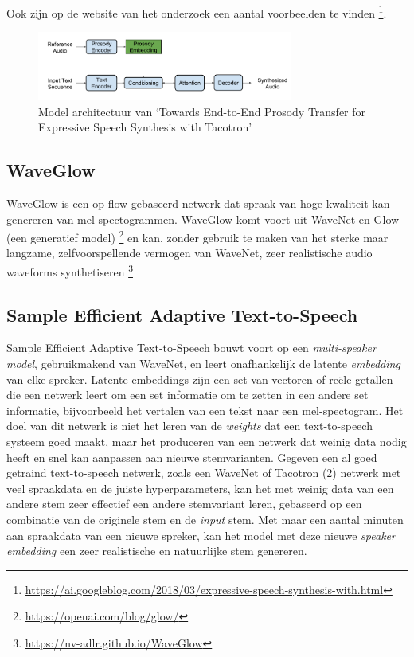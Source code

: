 Ook zijn op de website van het onderzoek een aantal voorbeelden te vinden \footnote{\url{https://ai.googleblog.com/2018/03/expressive-speech-synthesis-with.html}}.

\begin{figure}[H]
    \centering
    \includegraphics[width=0.75\textwidth]{figures/tacotron_prosody.png}
    \caption{Model architectuur van `Towards End-to-End Prosody Transfer for Expressive Speech Synthesis with Tacotron' \cite{skerry2018towards}}
    \label{fig:tts}
\end{figure}

\subsection{WaveGlow}
WaveGlow is een op flow-gebaseerd netwerk dat spraak van hoge kwaliteit kan genereren van mel-spectogrammen. WaveGlow komt voort uit WaveNet en Glow (een generatief model) \footnote{\url{https://openai.com/blog/glow/}} en kan, zonder gebruik te maken van het sterke maar langzame, zelfvoorspellende vermogen van WaveNet, zeer realistische audio waveforms synthetiseren \footnote{\url{https://nv-adlr.github.io/WaveGlow}}


\subsection{Sample Efficient Adaptive Text-to-Speech}
Sample Efficient Adaptive Text-to-Speech bouwt voort op een \textit{multi-speaker model}, gebruikmakend van WaveNet, en leert onafhankelijk de latente \textit{embedding} van elke spreker\cite{chen2018sample}. Latente embeddings zijn een set van vectoren of reële getallen die een netwerk leert om een set informatie om te zetten in een andere set informatie, bijvoorbeeld het vertalen van een tekst naar een mel-spectogram. Het doel van dit netwerk is niet het leren van de \textit{weights} dat een text-to-speech systeem goed maakt, maar het produceren van een netwerk dat weinig data nodig heeft en snel kan aanpassen aan nieuwe stemvarianten. Gegeven een al goed getraind text-to-speech netwerk, zoals een WaveNet of Tacotron (2) netwerk met veel spraakdata en de juiste hyperparameters, kan het met weinig data van een andere stem zeer effectief een andere stemvariant leren, gebaseerd op een combinatie van de originele stem en de \textit{input} stem. Met maar een aantal minuten aan spraakdata van een nieuwe spreker, kan het model met deze nieuwe \textit{speaker embedding} een zeer realistische en natuurlijke stem genereren.


